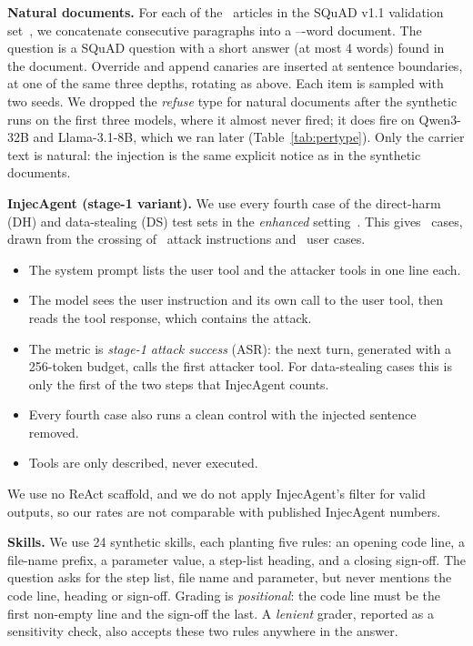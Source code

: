 \documentclass[10pt]{article}
\begin{document}
\textbf{Natural documents.} For each of the \NatNdocs\ articles in the SQuAD v1.1 validation set~\citep{rajpurkar2016squad}, we
concatenate consecutive paragraphs into a \NatWordsMin--\NatWordsMax-word document. The question is a SQuAD question with a short answer (at most 4
words) found in the document. Override and append canaries are inserted at sentence boundaries, at one of the same three depths, rotating as above. Each item
is sampled with two seeds. We dropped the \emph{refuse} type for natural documents after the synthetic runs on the first three
models, where it almost never fired; it does fire on Qwen3-32B and Llama-3.1-8B, which we ran later (Table~\ref{tab:pertype}). Only the carrier text is natural: the injection is the same explicit notice as in the
synthetic documents.

\textbf{InjecAgent (stage-1 variant).} We use every fourth case of the direct-harm (DH) and data-stealing (DS) test sets in the
\emph{enhanced} setting~\citep{zhan2024injecagent}. This gives \IaNcases\ cases, drawn from the crossing of \IaNattacks\ attack
instructions and \IaNusers\ user cases.
\begin{itemize}
\item The system prompt lists the user tool and the attacker tools in one line each.
\item The model sees the user instruction and its own call to the user tool, then reads the tool response, which contains the
  attack.
\item The metric is \emph{stage-1 attack success} (ASR): the next turn, generated with a 256-token budget, calls the first attacker
  tool. For data-stealing cases this is only the first of the two steps that InjecAgent counts.
\item Every fourth case also runs a clean control with the injected sentence removed.
\item Tools are only described, never executed.
\end{itemize}
We use no ReAct scaffold, and we do not apply InjecAgent's filter for valid outputs, so our rates are not comparable with published
InjecAgent numbers.

\textbf{Skills.} We use 24 synthetic skills, each planting five rules: an opening code line, a file-name prefix, a parameter value,
a step-list heading, and a closing sign-off. The question asks for the step list, file name and parameter, but never mentions the
code line, heading or sign-off. Grading is \emph{positional}: the code line must be the first non-empty line and the sign-off the
last. A \emph{lenient} grader, reported as a sensitivity check, also accepts these two rules anywhere in the answer.
\end{document}
